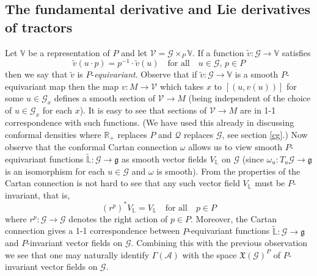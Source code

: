 \documentclass[a4paper,12pt]{amsart}
\theoremstyle{remark}
\begin{document}
\subsection{The fundamental derivative and Lie derivatives of tractors}

Let $\mathbb{V}$ be a representation of $P$ and let $\mathcal{V}=\mathcal{G}\times_P \mathbb{V}$. If a function $\tilde{v}:\mathcal{G}\rightarrow \mathbb{V}$ satisfies
$$
\tilde{v}(u\cdot p) = p^{-1}\cdot \tilde{v}(u) \quad \mbox{for all}\quad  u\in \mathcal{G},\, p\in P  
$$
then we say that $\tilde{v}$ is $P$-\emph{equivariant}. Observe that if $\tilde{v}:\mathcal{G}\rightarrow \mathbb{V}$ is a smooth $P$-equivariant map then the map $v:M\rightarrow \mathcal{V}$ which takes $x$ to $[(u,v(u))]$ for some $u\in \mathcal{G}_x$ defines a smooth section of $\mathcal{V}\rightarrow M$ (being independent of the choice of $u\in \mathcal{G}_x$ for each $x$). It is easy to see that sections of $\mathcal{V}\rightarrow M$ are in 1-1 correspondence with such functions. (We have used this already in discussing conformal densities where $\mathbb{R}_+$ replaces $P$ and $\mathcal{Q}$ replaces $\mathcal{G}$, see section \ref{cg}.) Now observe that the conformal Cartan connection $\omega$ allows us to view smooth $P$-equivariant functions $\tilde{\mathbb{L}}:\mathcal{G}\rightarrow\mathfrak{g}$ as smooth vector fields $V_\mathbb{L}$ on $\mathcal{G}$ (since $\omega_u:T_u \mathcal{G}\rightarrow \mathfrak{g}$ is an isomorphism for each $u\in\mathcal{G}$ and $\omega$ is smooth). From the properties of the Cartan connection is not hard to see that any such vector field $V_\mathbb{L}$ must be $P$-invariant, that is, 
$$
(r^p)^* V_\mathbb{L} = V_\mathbb{L} \quad \mbox{for all} \quad p\in P
$$
where $r^p:\mathcal{G}\rightarrow \mathcal{G}$ denotes the right action of $p\in P$. Moreover, the Cartan connection gives a 1-1 correspondence between $P$-equivariant functions $\tilde{\mathbb{L}}:\mathcal{G}\rightarrow\mathfrak{g}$ and $P$-invariant vector fields on $\mathcal{G}$. Combining this with the previous observation we see that one may naturally identify $\Gamma(\mathcal{A})$ with the space $\mathfrak{X}(\mathcal{G})^P$ of $P$-invariant vector fields on $\mathcal{G}$.
\end{document}
